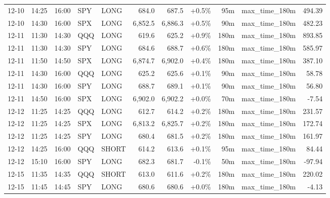 \documentclass[11pt,a4paper,twoside]{article}
\begin{document}
\begin{center}
\begin{longtable}{>{\color{txtmain}}l l l l l r r r r >{\color{txtmain}}l r}
12-10 & 14:25 & 16:00 & SPY & LONG & 684.0 & 687.5 & \textcolor{wingreen}{+0.5\%} & 95m & max\_time\_180m & \textcolor{wingreen}{494.39} \\
12-10 & 14:30 & 16:00 & SPX & LONG & 6,852.5 & 6,886.3 & \textcolor{wingreen}{+0.5\%} & 90m & max\_time\_180m & \textcolor{wingreen}{482.23} \\
12-11 & 11:30 & 14:30 & QQQ & LONG & 619.6 & 625.2 & \textcolor{wingreen}{+0.9\%} & 180m & max\_time\_180m & \textcolor{wingreen}{893.85} \\
12-11 & 11:30 & 14:30 & SPY & LONG & 684.6 & 688.7 & \textcolor{wingreen}{+0.6\%} & 180m & max\_time\_180m & \textcolor{wingreen}{585.97} \\
12-11 & 11:50 & 14:50 & SPX & LONG & 6,874.7 & 6,902.0 & \textcolor{wingreen}{+0.4\%} & 180m & max\_time\_180m & \textcolor{wingreen}{387.10} \\
12-11 & 14:30 & 16:00 & QQQ & LONG & 625.2 & 625.6 & \textcolor{wingreen}{+0.1\%} & 90m & max\_time\_180m & \textcolor{wingreen}{58.78} \\
12-11 & 14:30 & 16:00 & SPY & LONG & 688.7 & 689.1 & \textcolor{wingreen}{+0.1\%} & 90m & max\_time\_180m & \textcolor{wingreen}{56.80} \\
12-11 & 14:50 & 16:00 & SPX & LONG & 6,902.0 & 6,902.2 & \textcolor{wingreen}{+0.0\%} & 70m & max\_time\_180m & \textcolor{lossred}{-7.54} \\
12-12 & 11:25 & 14:25 & QQQ & LONG & 612.7 & 614.2 & \textcolor{wingreen}{+0.2\%} & 180m & max\_time\_180m & \textcolor{wingreen}{231.57} \\
12-12 & 11:25 & 14:25 & SPX & LONG & 6,813.2 & 6,825.7 & \textcolor{wingreen}{+0.2\%} & 180m & max\_time\_180m & \textcolor{wingreen}{172.74} \\
12-12 & 11:25 & 14:25 & SPY & LONG & 680.4 & 681.5 & \textcolor{wingreen}{+0.2\%} & 180m & max\_time\_180m & \textcolor{wingreen}{161.97} \\
12-12 & 14:25 & 16:00 & QQQ & SHORT & 614.2 & 613.6 & \textcolor{wingreen}{+0.1\%} & 95m & max\_time\_180m & \textcolor{wingreen}{84.44} \\
12-12 & 15:10 & 16:00 & SPY & LONG & 682.3 & 681.7 & \textcolor{lossred}{-0.1\%} & 50m & max\_time\_180m & \textcolor{lossred}{-97.94} \\
12-15 & 11:35 & 14:35 & QQQ & SHORT & 613.0 & 611.6 & \textcolor{wingreen}{+0.2\%} & 180m & max\_time\_180m & \textcolor{wingreen}{220.02} \\
12-15 & 11:45 & 14:45 & SPY & LONG & 680.6 & 680.6 & \textcolor{wingreen}{+0.0\%} & 180m & max\_time\_180m & \textcolor{lossred}{-4.13} \\

\end{longtable}
\end{center}
\end{document}
